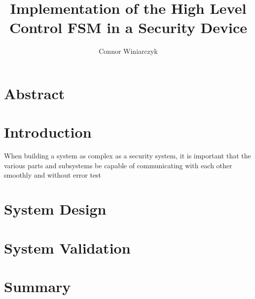 \documentclass[12pt]{article}
\begin{document}
\title{Implementation of the High Level Control FSM in a Security Device}
\author{Connor Winiarczyk}


\section{Abstract}


\section{Introduction}
When building a system as complex as a security system, it is important that the various parts and subsystems be capable of communicating with each other smoothly and without error test


\section{System Design}

\section{System Validation}

\section{Summary}
\end{document}
